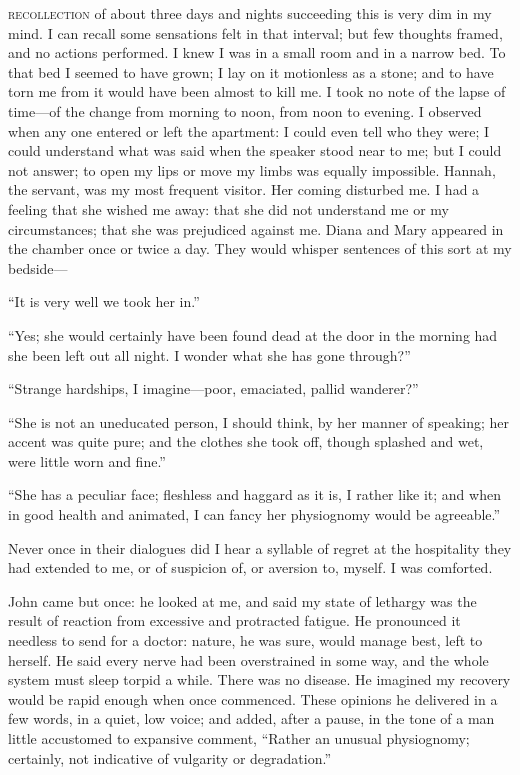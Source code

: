 
 \textsc{recollection} of about three days and nights succeeding this is very
dim in my mind. I can recall some sensations felt in that interval; but
few thoughts framed, and no actions performed. I knew I was in a small
room and in a narrow bed. To that bed I seemed to have grown; I lay on
it motionless as a stone; and to have torn me from it would have been
almost to kill me. I took no note of the lapse of time---of the change
from morning to noon, from noon to evening. I observed when any one
entered or left the apartment: I could even tell who they were; I could
understand what was said when the speaker stood near to me; but I could
not answer; to open my lips or move my limbs was equally impossible. 
Hannah, the servant, was my most frequent visitor. Her coming disturbed
me. I had a feeling that she wished me away: that she did not
understand me or my circumstances; that she was prejudiced against me. 
Diana and Mary appeared in the chamber once or twice a day. They would
whisper sentences of this sort at my bedside---

\enquote{It is very well we took her in.}

\enquote{Yes; she would certainly have been found dead at the door in
the morning had she been left out all night. I wonder what she has gone
through?}

\enquote{Strange hardships, I imagine---poor, emaciated, pallid
wanderer?}

\enquote{She is not an uneducated person, I should think, by her manner
of speaking; her accent was quite pure; and the clothes she took off,
though splashed and wet, were little worn and fine.}

\enquote{She has a peculiar face; fleshless and haggard as it is, I
rather like it; and when in good health and animated, I can fancy her
physiognomy would be agreeable.}

Never once in their dialogues did I hear a syllable of regret at the
hospitality they had extended to me, or of suspicion of, or aversion to,
myself. I was comforted.

\Mr{} \St{} John came but once: he looked at me, and said my state of
lethargy was the result of reaction from excessive and protracted
fatigue. He pronounced it needless to send for a doctor: nature, he was
sure, would manage best, left to herself. He said every nerve had been
overstrained in some way, and the whole system must sleep torpid a
while. There was no disease. He imagined my recovery would be rapid
enough when once commenced. These opinions he delivered in a few words,
in a quiet, low voice; and added, after a pause, in the tone of a man
little accustomed to expansive comment, \enquote{Rather an unusual
physiognomy; certainly, not indicative of vulgarity or degradation.}

